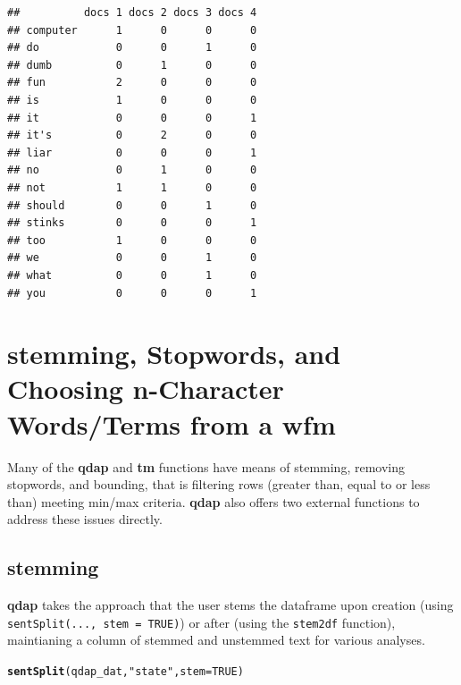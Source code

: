 \documentclass{article}\usepackage[]{graphicx}\usepackage[]{color}
\makeatletter
\newcommand{\hlnum}[1]{\textcolor[rgb]{0.686,0.059,0.569}{#1}}%
\newcommand{\hlstr}[1]{\textcolor[rgb]{0.192,0.494,0.8}{#1}}%
\newcommand{\hlstd}[1]{\textcolor[rgb]{0.345,0.345,0.345}{#1}}%
\newcommand{\hlkwc}[1]{\textcolor[rgb]{0.333,0.667,0.333}{#1}}%
\newcommand{\hlkwd}[1]{\textcolor[rgb]{0.737,0.353,0.396}{\textbf{#1}}}%
\newenvironment{kframe}{%
 \def\at@end@of@kframe{}%
 \ifinner\ifhmode%
  \def\at@end@of@kframe{\end{minipage}}%
  \begin{minipage}{\columnwidth}%
 \fi\fi%
 \def\FrameCommand##1{\hskip\@totalleftmargin \hskip-\fboxsep
 \colorbox{shadecolor}{##1}\hskip-\fboxsep
     \hskip-\linewidth \hskip-\@totalleftmargin \hskip\columnwidth}%
 \MakeFramed {\advance\hsize-\width
   \@totalleftmargin\z@ \linewidth\hsize
   \@setminipage}}%
 {\par\unskip\endMakeFramed%
 \at@end@of@kframe}
\newenvironment{knitrout}{}{} %
\makeatother
\begin{document}
\begin{knitrout}
\color{fgcolor}\begin{kframe}
\begin{verbatim}
##          docs 1 docs 2 docs 3 docs 4
## computer      1      0      0      0
## do            0      0      1      0
## dumb          0      1      0      0
## fun           2      0      0      0
## is            1      0      0      0
## it            0      0      0      1
## it's          0      2      0      0
## liar          0      0      0      1
## no            0      1      0      0
## not           1      1      0      0
## should        0      0      1      0
## stinks        0      0      0      1
## too           1      0      0      0
## we            0      0      1      0
## what          0      0      1      0
## you           0      0      0      1
\end{verbatim}
\end{kframe}
\end{knitrout}


\section{stemming, Stopwords, and Choosing n-Character Words/Terms from a wfm}


Many of the \textbf{qdap} and \textbf{tm} functions have means of stemming, removing stopwords, and bounding, that is filtering rows (greater than, equal to or less than) meeting min/max criteria.  \textbf{qdap} also offers two external functions to address these issues directly.  


\subsection{stemming}

\textbf{qdap} takes the approach that the user stems the dataframe upon creation (using \texttt{sentSplit(..., stem = TRUE)}) or after (using the \texttt{stem2df} function), maintianing a column of stemmed and unstemmed text for various analyses.

\begin{knitrout}
\color{fgcolor}\begin{kframe}
\begin{alltt}
\hlkwd{sentSplit}\hlstd{(qdap_dat,} \hlstr{"state"}\hlstd{,} \hlkwc{stem} \hlstd{=} \hlnum{TRUE}\hlstd{)}
\end{alltt}
\end{kframe}
\end{knitrout}
\end{document}

